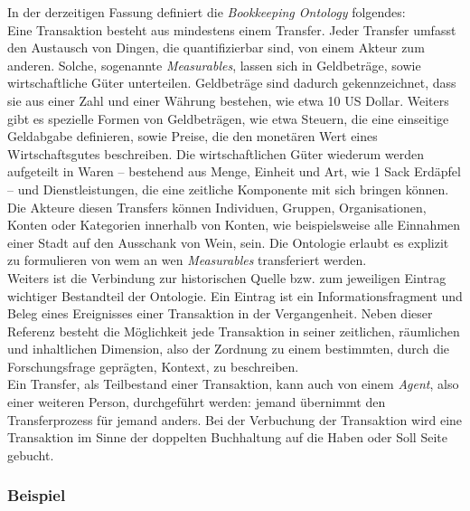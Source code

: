 \documentclass[12pt,a4paper]{article}
\begin{document}
In der derzeitigen Fassung definiert die \textit{Bookkeeping Ontology} folgendes:
\\
Eine Transaktion besteht aus mindestens einem Transfer. Jeder Transfer umfasst den Austausch von Dingen, die quantifizierbar sind, von einem Akteur zum anderen. Solche, sogenannte \textit{Measurables}, lassen sich in Geldbeträge, sowie wirtschaftliche Güter unterteilen. Geldbeträge sind dadurch gekennzeichnet, dass sie aus einer Zahl und einer Währung bestehen, wie etwa 10 US Dollar. Weiters gibt es spezielle Formen von Geldbeträgen, wie etwa Steuern, die eine einseitige Geldabgabe definieren, sowie Preise, die den monetären Wert eines Wirtschaftsgutes beschreiben. Die wirtschaftlichen Güter wiederum werden aufgeteilt in Waren -- bestehend aus Menge, Einheit und Art, wie 1 Sack Erdäpfel -- und Dienstleistungen, die eine zeitliche Komponente mit sich bringen können. Die Akteure diesen Transfers können Individuen, Gruppen, Organisationen, Konten oder Kategorien innerhalb von Konten, wie beispielsweise alle Einnahmen einer Stadt auf den Ausschank von Wein, sein. Die Ontologie erlaubt es explizit zu formulieren von wem an wen \textit{Measurables} transferiert werden.
\\
Weiters ist die Verbindung zur historischen Quelle bzw. zum jeweiligen Eintrag wichtiger Bestandteil der Ontologie. Ein Eintrag ist ein Informationsfragment und Beleg eines Ereignisses einer Transaktion in der Vergangenheit. Neben dieser Referenz besteht die Möglichkeit jede Transaktion in seiner zeitlichen, räumlichen und inhaltlichen Dimension, also der Zordnung zu einem bestimmten, durch die Forschungsfrage geprägten, Kontext, zu beschreiben.
\\
Ein Transfer, als Teilbestand einer Transaktion, kann auch von einem \textit{Agent}, also einer weiteren Person, durchgeführt werden: jemand übernimmt den Transferprozess für jemand anders. Bei der Verbuchung der Transaktion wird eine Transaktion im Sinne der doppelten Buchhaltung auf die Haben oder Soll Seite gebucht. 


\subsubsection{Beispiel}
\label{Beispiel}
\end{document}
